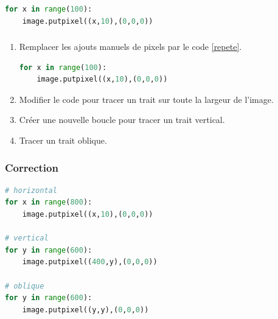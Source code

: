 \documentclass[svgnames,11pt]{beamer}
\begin{document}
\begin{frame}[fragile]
    \frametitle{}

\begin{center}
\begin{lstlisting}[language=Python , basicstyle=\ttfamily\small, xleftmargin=2em, xrightmargin=2em]
for x in range(100):
    image.putpixel((x,10),(0,0,0))
\end{lstlisting}
\label{CODE}
\end{center}

\end{frame}
\begin{frame}[fragile]
    \frametitle{}

    \begin{activite}
    \begin{enumerate}
        \item Remplacer les ajouts manuels de pixels par le code \ref{repete}.
\begin{center}
\begin{lstlisting}[language=Python , basicstyle=\ttfamily\small, xleftmargin=2em, xrightmargin=2em]
for x in range(100):
    image.putpixel((x,10),(0,0,0))
\end{lstlisting}
\label{repete}
\end{center}
\item Modifier le code pour tracer un trait sur toute la largeur de l'image.
        \item Créer une nouvelle boucle pour tracer un trait vertical.
        \item Tracer un trait oblique.
    \end{enumerate}
    \end{activite}

\end{frame}
\begin{frame}[fragile]
    \frametitle{Correction}

\begin{center}
\begin{lstlisting}[language=Python , basicstyle=\ttfamily\small, xleftmargin=2em, xrightmargin=2em]
# horizontal
for x in range(800):
    image.putpixel((x,10),(0,0,0))

# vertical
for y in range(600):
    image.putpixel((400,y),(0,0,0))

# oblique
for y in range(600):
    image.putpixel((y,y),(0,0,0))
\end{lstlisting}
\label{CODE}
\end{center}

\end{frame}
\end{document}
